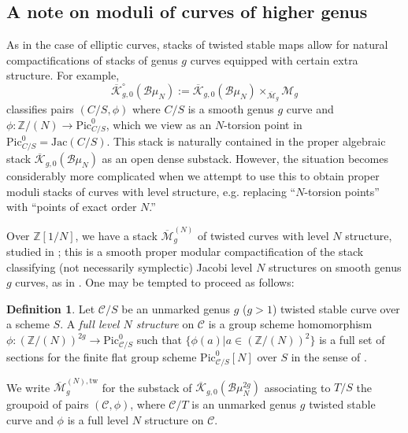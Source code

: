 \documentclass[11pt]{amsart}
\theoremstyle{definition}
\newtheorem{definition}[subsection]{Definition}
\begin{document}
\begin{appendix}
\section{A note on moduli of curves of higher genus}

As in the case of elliptic curves, stacks of twisted stable maps allow for natural compactifications of stacks of genus $g$ curves equipped with certain extra structure. For example, 
\begin{displaymath}
\overline{\mathcal{K}}^\circ_{g,0}({\mathcal{B}}\mu_N) := \overline{\mathcal{K}}_{g,0} ({\mathcal{B}}\mu_N) \times_{\overline{\mathcal{M}}_g} {\mathcal{M}}_g
\end{displaymath}
classifies pairs $(C/S,\phi)$ where $C/S$ is a smooth genus $g$ curve and $\phi: \mathbb{Z}/(N) \rightarrow \mathrm{Pic}^0_{C/S}$, which we view as an $N$-torsion point in $\mathrm{Pic}^0_{C/S} = \mathrm{Jac}(C/S)$. This stack is naturally contained in the proper algebraic stack $\overline{\mathcal{K}}_{g,0}({\mathcal{B}}\mu_N)$ as an open dense substack. However, the situation becomes considerably more complicated when we attempt to use this to obtain proper moduli stacks of curves with level structure, e.g. replacing ``$N$-torsion points'' with ``points of exact order $N$.''

Over $\mathbb{Z}[1/N]$, we have a stack $\overline{\mathcal{M}}^{(N)}_g$ of twisted curves with level $N$ structure, studied in \cite[\S6]{ACV}; this is a smooth proper modular compactification of the stack classifying (not necessarily symplectic) Jacobi level $N$ structures on smooth genus $g$ curves, as in \cite[5.4]{DM}. One may be tempted to proceed as follows:
\begin{definition}
Let ${\mathcal{C}}/S$ be an unmarked genus $g$ ($g>1$) twisted stable curve over a scheme $S$. A \textit{full level $N$ structure} on ${\mathcal{C}}$ is a group scheme homomorphism $\phi: (\mathbb{Z}/(N))^{2g} \rightarrow \mathrm{Pic}^0_{{\mathcal{C}}/S}$ such that $\{\phi(a)|a\in (\mathbb{Z}/(N))^2\}$ is a full set of sections for the finite flat group scheme $\mathrm{Pic}^0_{{\mathcal{C}}/S}[N]$ over $S$ in the sense of \cite[\S1.8]{KM1}.

We write $\overline{\mathcal{M}}^{(N),\mathrm{tw}}_g$ for the substack of $\overline{\mathcal{K}}_{g,0}({\mathcal{B}}\mu_N^{2g})$ associating to $T/S$ the groupoid of pairs $({\mathcal{C}},\phi)$, where ${\mathcal{C}}/T$ is an unmarked genus $g$ twisted stable curve and $\phi$ is a full level $N$ structure on ${\mathcal{C}}$.
\end{definition}


\end{appendix}
\end{document}
